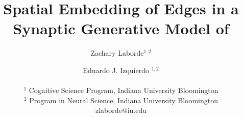 \title{Spatial Embedding of Edges in a Synaptic Generative Model of \\
 \ce}

\author{Zachary Laborde$^{1,2}$ \and Eduardo J. Izquierdo $^{1,2}$\\
\mbox{} \\
$^1$ Cognitive Science Program, Indiana University Bloomington\\
$^2$ Program in Neural Science, Indiana University Bloomington\\
zlaborde@iu.edu}
